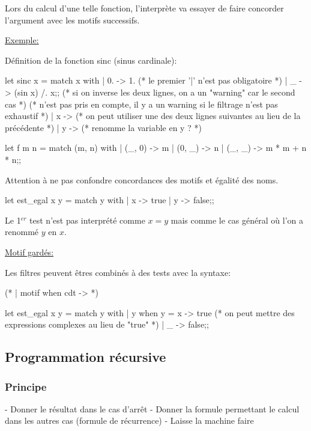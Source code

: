 \documentclass{article}
\begin{document}
			Lors du calcul d'une telle fonction, l'interprète va essayer de faire concorder l'argument avec les motifs successifs.
			
			\underline{Exemple:}
			
			Définition de la fonction sinc (sinus cardinale):
			
			\begin{case}
let sinc x = match x with
| 0. -> 1. (* le premier '|' n'est pas obligatoire *)
| _ -> (sin x) /. x;; (* si on inverse les deux lignes, on a un "warning" car le second cas *)
(* n'est pas pris en compte, il y a un warning si le filtrage n'est pas exhaustif *)
| x -> (* on peut utiliser une des deux lignes suivantes au lieu de la précédente *)
| y -> (* renomme la variable en y ? *)

let f m n = match (m, n) with
| (_, 0) -> m
| (0, _) -> n
| (_, _) -> m * m + n * n;;
			\end{case}
			
			Attention à ne pas confondre concordances des motifs et égalité des noms. %
			
			\begin{case}
let est_egal x y = match y with
| x -> true
| y -> false;;
			\end{case}
			
			Le 1$^{er}$ test n'est pas interprété comme $x = y$ mais comme le cas général où l'on a renommé $y$ en $x$.
			
			\underline{Motif gardés:}
			
			Les filtres peuvent êtres combinés à des tests avec la syntaxe:
			
			\begin{case}
(* | motif when cdt -> *)

let est_egal x y = match y with
| y when y = x -> true (* on peut mettre des expressions complexes au lieu de "true" *)
| _ -> false;;
			\end{case}
			
		\subsection{Programmation récursive}
			
			\subsubsection{Principe}
			
				- Donner le résultat dans le cas d'arrêt
				- Donner la formule permettant le calcul dans les autres cas (formule de récurrence)
				- Laisse la machine faire
				
\end{document}
